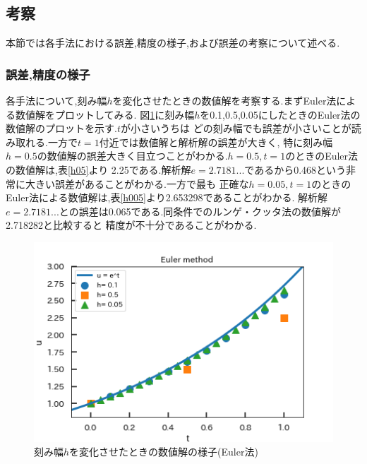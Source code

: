 \documentclass[dvipdfmx]{jarticle}
\begin{document}
    \subsection{考察}
    本節では各手法における誤差,精度の様子,および誤差の考察について述べる.
    \subsubsection{誤差,精度の様子}
    各手法について,刻み幅$h$を変化させたときの数値解を考察する.まずEuler法による数値解をプロットしてみる.
    図\ref{eulerplt}に刻み幅$h$を0.1,0.5,0.05にしたときのEuler法の数値解のプロットを示す.$t$が小さいうちは
    どの刻み幅でも誤差が小さいことが読み取れる.一方で$t=1$付近では数値解と解析解の誤差が大きく,
    特に刻み幅$h=0.5$の数値解の誤差大きく目立つことがわかる.$h=0.5,t=1$のときのEuler法の数値解は,表\ref{h05}より
    2.25である.解析解$e=2.7181...$であるから0.468という非常に大きい誤差があることがわかる.一方で最も
    正確な$h=0.05,t=1$のときのEuler法による数値解は,表\ref{h005}より2.653298であることがわかる.
    解析解$e=2.7181...$との誤差は0.065である.同条件でのルンゲ・クッタ法の数値解が2.718282と比較すると
    精度が不十分であることがわかる.

    \begin{figure}[H]
      \centering
      \includegraphics[scale=0.75]{kadai3.png}
      \caption{刻み幅$h$を変化させたときの数値解の様子(Euler法)}
       \label{eulerplt}
      \end{figure}
\end{document}
